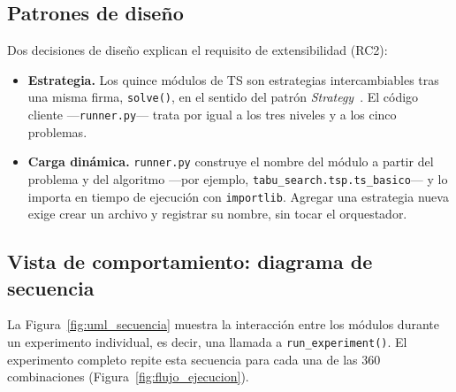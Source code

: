 \subsection{Patrones de diseño}

Dos decisiones de diseño explican el requisito de extensibilidad (RC2):

\begin{itemize}
  \item \textbf{Estrategia.} Los quince módulos de TS son estrategias
    intercambiables tras una misma firma, \texttt{solve()}, en el sentido del
    patrón \emph{Strategy}~\cite{gamma1994design}. El código cliente
    —\texttt{runner.py}— trata por igual a los tres niveles y a los cinco
    problemas.
  \item \textbf{Carga dinámica.} \texttt{runner.py} construye el nombre del
    módulo a partir del problema y del algoritmo —por ejemplo,
    \texttt{tabu\_search.\allowbreak tsp.\allowbreak ts\_basico}— y lo
    importa en tiempo de ejecución con \texttt{importlib}. Agregar una estrategia nueva
    exige crear un archivo y registrar su nombre, sin tocar el orquestador.
\end{itemize}

\subsection{Vista de comportamiento: diagrama de secuencia}

La Figura~\ref{fig:uml_secuencia} muestra la interacción entre los módulos
durante un experimento individual, es decir, una llamada a
\texttt{run\_experiment()}. El experimento completo repite esta secuencia
para cada una de las 360 combinaciones (Figura~\ref{fig:flujo_ejecucion}).


